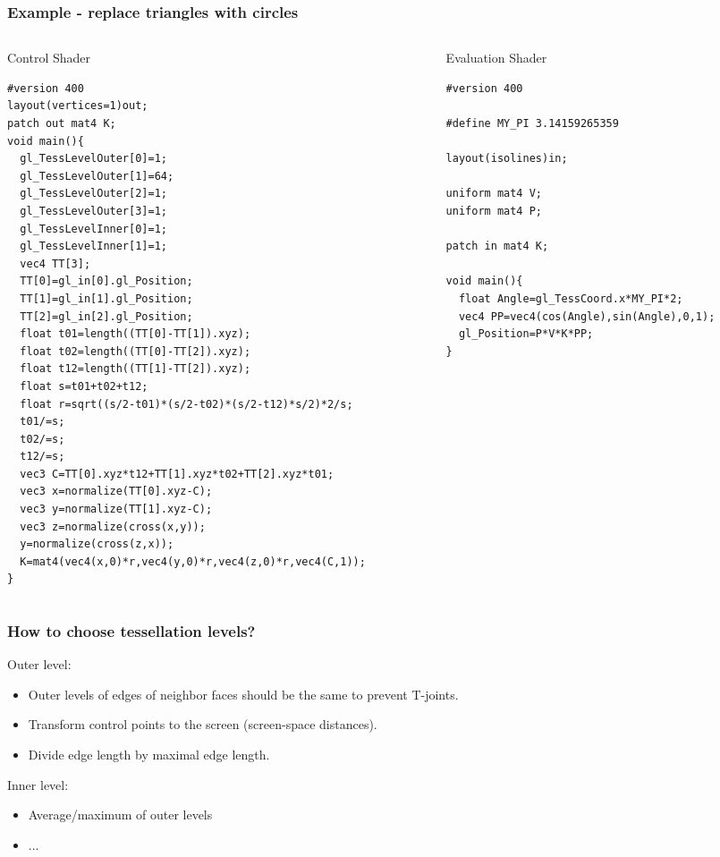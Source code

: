 \begin{frame}[fragile]
    \frametitle{Example - replace triangles with circles}
  \begin{columns}[T]
    \begin{column}{.44\textwidth}
      Control Shader
  	{\tiny
		\begin{verbatim}
#version 400
layout(vertices=1)out;
patch out mat4 K;
void main(){
  gl_TessLevelOuter[0]=1;
  gl_TessLevelOuter[1]=64;
  gl_TessLevelOuter[2]=1;
  gl_TessLevelOuter[3]=1;
  gl_TessLevelInner[0]=1;
  gl_TessLevelInner[1]=1;
  vec4 TT[3];
  TT[0]=gl_in[0].gl_Position;
  TT[1]=gl_in[1].gl_Position;
  TT[2]=gl_in[2].gl_Position;
  float t01=length((TT[0]-TT[1]).xyz);
  float t02=length((TT[0]-TT[2]).xyz);
  float t12=length((TT[1]-TT[2]).xyz);
  float s=t01+t02+t12;
  float r=sqrt((s/2-t01)*(s/2-t02)*(s/2-t12)*s/2)*2/s;
  t01/=s;
  t02/=s;
  t12/=s;
  vec3 C=TT[0].xyz*t12+TT[1].xyz*t02+TT[2].xyz*t01;
  vec3 x=normalize(TT[0].xyz-C);
  vec3 y=normalize(TT[1].xyz-C);
  vec3 z=normalize(cross(x,y));
  y=normalize(cross(z,x));
  K=mat4(vec4(x,0)*r,vec4(y,0)*r,vec4(z,0)*r,vec4(C,1));
}
  	\end{verbatim}
		}
    \end{column}
    \begin{column}{.48\textwidth}
      Evaluation Shader
  	{\tiny
		\begin{verbatim}
#version 400

#define MY_PI 3.14159265359

layout(isolines)in;

uniform mat4 V;
uniform mat4 P;

patch in mat4 K;

void main(){
  float Angle=gl_TessCoord.x*MY_PI*2;
  vec4 PP=vec4(cos(Angle),sin(Angle),0,1);
  gl_Position=P*V*K*PP;
}
  	\end{verbatim}
		}
    \end{column}
  \end{columns}

\end{frame}


\begin{frame}
\frametitle{How to choose tessellation levels?}
	Outer level:
	\begin{itemize}
	\item Outer levels of edges of neighbor faces should be the same to prevent T-joints.
  \item Transform control points to the screen (screen-space distances).
	\item Divide edge length by maximal edge length.
	\end{itemize}
	Inner level:
	\begin{itemize}
	\item Average/maximum of outer levels
  \item ...
	\end{itemize}
\end{frame}

